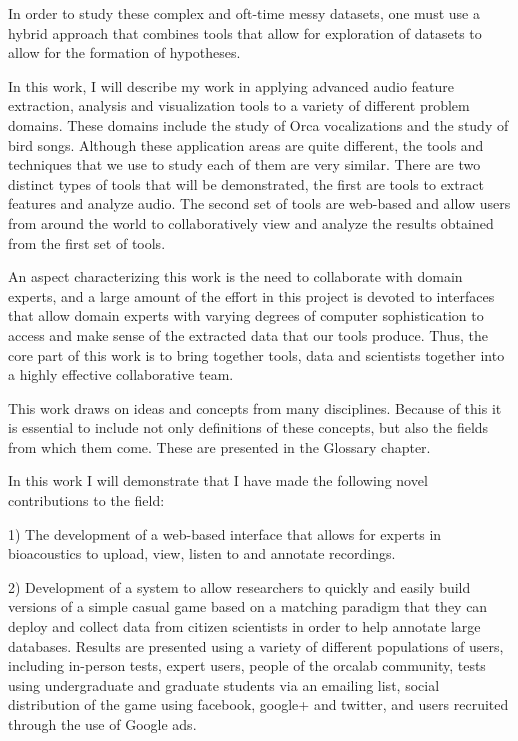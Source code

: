 In order to study these complex and oft-time messy datasets, one must
use a hybrid approach that combines tools that allow for exploration
of datasets to allow for the formation of hypotheses.  

In this work, I will describe my work in applying advanced audio
feature extraction, analysis and visualization tools to a variety of
different problem domains.  These domains include the study of Orca
vocalizations and the study of bird songs.  Although these application
areas are quite different, the tools and techniques that we use to
study each of them are very similar.  There are two distinct types of
tools that will be demonstrated, the first are tools to extract
features and analyze audio.  The second set of tools are web-based and
allow users from around the world to collaboratively view and analyze
the results obtained from the first set of tools.

An aspect characterizing this work is the need to collaborate with
domain experts, and a large amount of the effort in this project is
devoted to interfaces that allow domain experts with varying degrees
of computer sophistication to access and make sense of the extracted
data that our tools produce.  Thus, the core part of this work is to
bring together tools, data and scientists together into a highly
effective collaborative team.

This work draws on ideas and concepts from many disciplines.  Because
of this it is essential to include not only definitions of these
concepts, but also the fields from which them come.  These are
presented in the Glossary chapter.

In this work I will demonstrate that I have made the following novel
contributions to the field:

1) The development of a web-based interface that allows for experts in
bioacoustics to upload, view, listen to and annotate recordings.

2) Development of a system to allow researchers to quickly and easily
build versions of a simple casual game based on a matching paradigm
that they can deploy and collect data from citizen scientists in order
to help annotate large databases.  Results are presented using a
variety of different populations of users, including in-person tests,
expert users, people of the orcalab community, tests using
undergraduate and graduate students via an emailing list, social
distribution of the game using facebook, google+ and twitter, and
users recruited through the use of Google ads.

